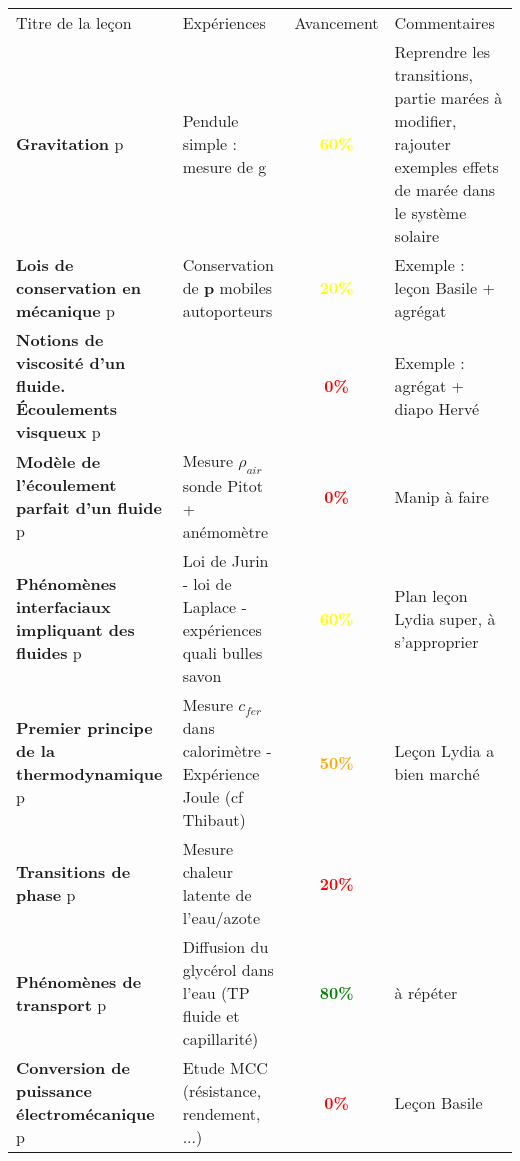 \begin{changemargin}{-1.5cm}{-0cm}

\begin{center}
\begin{tabularx}{\paperwidth-2cm}{| X | X | c | X |}
  \hline
  \rowcolor{gray!20}\multicolumn{4}{c}{Avancement préparation oraux Leçons Physique} \\
  \hline 
  Titre de la leçon & Expériences & Avancement & Commentaires \\
  \hline
\textbf{Gravitation} p\pageref{LP_Gravitation}  & Pendule simple : mesure de g & \textcolor{yellow}{\textbf{60\%}}  & Reprendre les transitions, partie marées à modifier, rajouter exemples effets de marée dans le système solaire   \\
  \hline 
  \hline
     \textbf{Lois de conservation en mécanique} p\pageref{LP_LoisConservation} & Conservation de $\mathbf{p}$ mobiles autoporteurs  &  \textcolor{yellow}{\textbf{20\%}}  & Exemple : leçon Basile + agrégat \\
  \hline 
    \textbf{Notions de viscosité d'un fluide. \'{E}coulements visqueux} p\pageref{LP_Viscosite} &  & \textcolor{red}{\textbf{0\%}} &  Exemple : agrégat + diapo Hervé   \\
  \hline 
  \textbf{Modèle de l'écoulement parfait d'un fluide} p\pageref{LP_EcoulementParfait} & Mesure $\rho_{air}$ sonde Pitot + anémomètre & \textcolor{red}{\textbf{0\%}} & Manip à faire \\
  \hline
  \textbf{Phénomènes interfaciaux impliquant des fluides} p\pageref{LP_PhenomenesInterfaciaux} & Loi de Jurin - loi de Laplace - expériences quali bulles savon & \textcolor{yellow}{\textbf{60\%}} & Plan leçon Lydia super, à s'approprier\\
  \hline 
  \hline
  \textbf{Premier principe de la thermodynamique} p\pageref{LP_PremierPrincipe} & Mesure $c_{fer}$ dans calorimètre - Expérience Joule (cf Thibaut) & \textcolor{orange}{\textbf{50\%}} & Leçon Lydia a bien marché \\
  \hline 
  \textbf{Transitions de phase} p\pageref{LP_TransitionPhase} & Mesure chaleur latente de l'eau/azote & \textcolor{red}{\textbf{20\%}} & \\
  \hline 
  \textbf{Phénomènes de transport} p\pageref{LP_Transport} & Diffusion du glycérol dans l'eau (TP fluide et capillarité) & \textcolor{green}{\textbf{80\%}} & à répéter\\
  \hline 
  \hline
  \textbf{Conversion de puissance électromécanique} p\pageref{LP_ConversionPuissance} & Etude MCC (résistance, rendement, ...) & \textcolor{red}{\textbf{0\%}} & Leçon Basile\\

\end{tabularx}
\end{center}
\end{changemargin}
